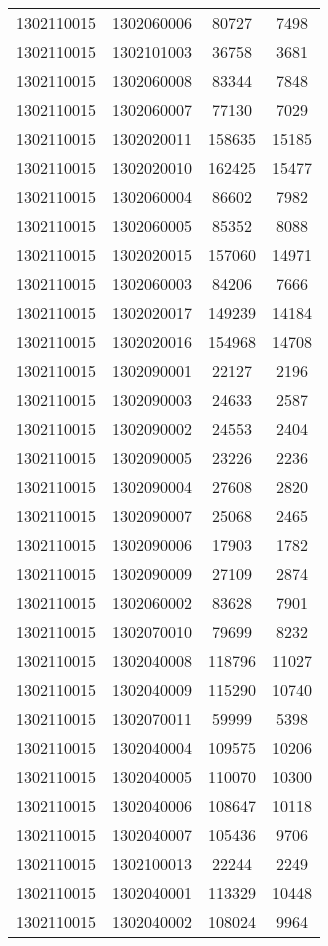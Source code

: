 \begin{longtable}[h]{llcc}
		1302110015 & 1302060006 & 80727 & 7498\\
		1302110015 & 1302101003 & 36758 & 3681\\
		1302110015 & 1302060008 & 83344 & 7848\\
		1302110015 & 1302060007 & 77130 & 7029\\
		1302110015 & 1302020011 & 158635 & 15185\\
		1302110015 & 1302020010 & 162425 & 15477\\
		1302110015 & 1302060004 & 86602 & 7982\\
		1302110015 & 1302060005 & 85352 & 8088\\
		1302110015 & 1302020015 & 157060 & 14971\\
		1302110015 & 1302060003 & 84206 & 7666\\
		1302110015 & 1302020017 & 149239 & 14184\\
		1302110015 & 1302020016 & 154968 & 14708\\
		1302110015 & 1302090001 & 22127 & 2196\\
		1302110015 & 1302090003 & 24633 & 2587\\
		1302110015 & 1302090002 & 24553 & 2404\\
		1302110015 & 1302090005 & 23226 & 2236\\
		1302110015 & 1302090004 & 27608 & 2820\\
		1302110015 & 1302090007 & 25068 & 2465\\
		1302110015 & 1302090006 & 17903 & 1782\\
		1302110015 & 1302090009 & 27109 & 2874\\
		1302110015 & 1302060002 & 83628 & 7901\\
		1302110015 & 1302070010 & 79699 & 8232\\
		1302110015 & 1302040008 & 118796 & 11027\\
		1302110015 & 1302040009 & 115290 & 10740\\
		1302110015 & 1302070011 & 59999 & 5398\\
		1302110015 & 1302040004 & 109575 & 10206\\
		1302110015 & 1302040005 & 110070 & 10300\\
		1302110015 & 1302040006 & 108647 & 10118\\
		1302110015 & 1302040007 & 105436 & 9706\\
		1302110015 & 1302100013 & 22244 & 2249\\
		1302110015 & 1302040001 & 113329 & 10448\\
		1302110015 & 1302040002 & 108024 & 9964\\

\end{longtable}
